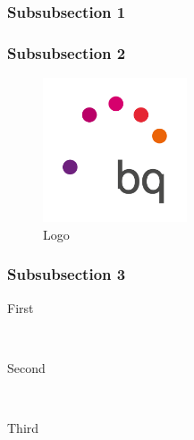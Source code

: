 \documentclass[12pt]{article} %
\begin{document}
\subsubsection{Subsubsection 1} %

\lipsum[6] %


\subsubsection{Subsubsection 2} %

\lipsum[6] %
\begin{figure} %
  \begin{center}
    \includegraphics[width=0.38\textwidth]{logo}
  \end{center}
  \caption{Logo}
\end{figure}
\lipsum[7-8] %


\subsubsection{Subsubsection 3} %

\begin{description} %

\item[First] \hfill \\
\lipsum[9] %

\item[Second] \hfill \\
\lipsum[10] %

\item[Third] \hfill \\
\lipsum[11] %

\end{description} 
\end{document}
